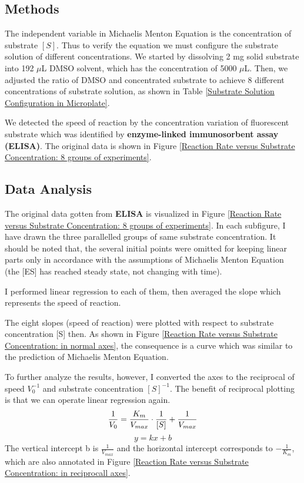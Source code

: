 \documentclass{report}
\begin{document}
\subsection{Methods}

The independent variable in Michaelis Menton Equation is the concentration of substrate $[S]$.
Thus to verify the equation we must configure the substrate solution of different concentrations.
We started by dissolving 2 mg solid substrate into 192 $\mu$L DMSO solvent, which has the concentration of 5000 $\mu$L.
Then, we adjusted the ratio of DMSO and concentrated substrate to achieve 8 different concentrations of substrate solution, as shown in Table \ref{Substrate Solution Configuration in Microplate}.

We detected the speed of reaction by the concentration variation of fluorescent substrate which was identified by \textbf{enzyme-linked immunosorbent assay (ELISA)}.
The original data is shown in Figure \ref{Reaction Rate versus Substrate Concentration: 8 groups of experiments}.

\subsection{Data Analysis}

The original data gotten from \textbf{ELISA} is visualized in Figure \ref{Reaction Rate versus Substrate Concentration: 8 groups of experiments}.
In each subfigure, I have drawn the three parallelled groups of same substrate concentration.
It should be noted that, the several initial points were omitted for keeping linear parts only in accordance with the assumptions of Michaelis Menton Equation (the [ES] has reached steady state, not changing with time).

I performed linear regression to each of them, then averaged the slope which represents the speed of reaction.

The eight slopes (speed of reaction) were plotted with respect to substrate concentration [S] then.
As shown in Figure \ref{Reaction Rate versus Substrate Concentration: in normal axes}, the consequence is a curve which was similar to the prediction of Michaelis Menton Equation.

To further analyze the results, however, I converted the axes to the reciprocal of speed $V_0^{-1}$ and substrate concentration $[S]^{-1}$.
The benefit of reciprocal plotting is that we can operate linear regression again.
$$
\frac{1}{V_0}=\frac{K_m}{V_{max}}\cdot \frac{1}{[S]}+\frac{1}{V_{max}}\\
$$
$$
y=kx+b
$$
The vertical intercept b is $\frac{1}{V_{max}}$ and the horizontal intercept corresponds to $-\frac{1}{K_m}$, which are also annotated in Figure \ref{Reaction Rate versus Substrate Concentration: in reciprocall axes}.
\end{document}
